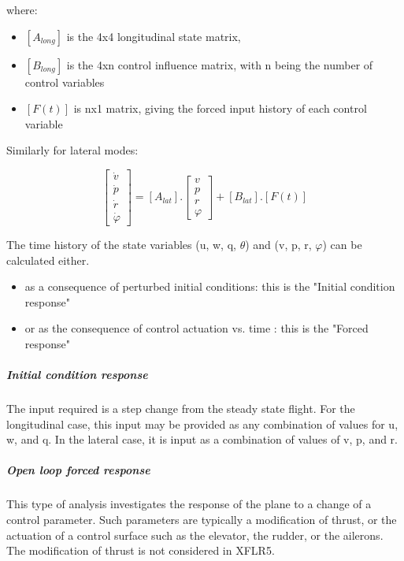 \documentclass[a4paper,twoside,12pt,dvips]{article}
\begin{document}
where:

\begin{itemize}
\item $\left[A_{long}\right]$ is the 4x4 longitudinal state matrix,
\item $\left[B_{long}\right]$ is the 4xn control influence matrix,
with n being the number of control variables
\item $\left[F(t)\right]$ is nx1 matrix, giving the forced input
history of each control variable
\end{itemize}

Similarly for lateral modes:

$$\left[\begin{matrix} \dot{v} \\ \dot{p} \\ \dot{r} \\ \dot{\varphi} \end{matrix}\right] = \left[A_{lat}\right] . \left[\begin{matrix} v \\ p \\ r \\ \varphi \end{matrix}\right] + \left[B_{lat}\right] . \left[F(t)\right]$$

The time history of the state variables (u, w, q, $\theta$)
and (v, p, r, $\varphi$) can be calculated either.

\begin{itemize}
\item as a consequence of perturbed initial conditions: this is
the "Initial condition response"
\item or as the consequence of control actuation vs. time : this is
the "Forced response"
\end{itemize}

\subparagraph{Initial condition response}

The input required is a step change from the steady state flight. For
the longitudinal case, this input may be provided as any combination
of values for u, w, and q. In the lateral case, it is input as a
combination of values of v, p, and r.

\subparagraph{Open loop forced response}

This type of analysis investigates the response of the plane to a
change of a control parameter. Such parameters are typically a
modification of thrust, or the actuation of a control surface such as
the elevator, the rudder, or the ailerons. The modification of thrust
is not considered in XFLR5.
\end{document}
